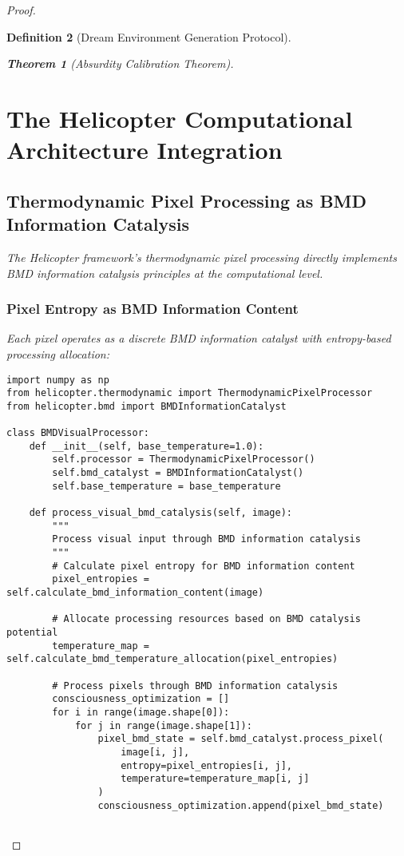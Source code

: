 \documentclass[12pt,a4paper]{article}
\newtheorem{theorem}{Theorem}[section]
\newtheorem{definition}[theorem]{Definition}
\begin{document}
\begin{proof}
\begin{definition}[Dream Environment Generation Protocol]
\begin{theorem}[Absurdity Calibration Theorem]
\section{The Helicopter Computational Architecture Integration}

\subsection{Thermodynamic Pixel Processing as BMD Information Catalysis}

The Helicopter framework's thermodynamic pixel processing directly implements BMD information catalysis principles at the computational level.

\subsubsection{Pixel Entropy as BMD Information Content}

Each pixel operates as a discrete BMD information catalyst with entropy-based processing allocation:

\begin{lstlisting}[style=pythonstyle, caption=BMD Thermodynamic Pixel Processing]
import numpy as np
from helicopter.thermodynamic import ThermodynamicPixelProcessor
from helicopter.bmd import BMDInformationCatalyst

class BMDVisualProcessor:
    def __init__(self, base_temperature=1.0):
        self.processor = ThermodynamicPixelProcessor()
        self.bmd_catalyst = BMDInformationCatalyst()
        self.base_temperature = base_temperature
        
    def process_visual_bmd_catalysis(self, image):
        """
        Process visual input through BMD information catalysis
        """
        # Calculate pixel entropy for BMD information content
        pixel_entropies = self.calculate_bmd_information_content(image)
        
        # Allocate processing resources based on BMD catalysis potential
        temperature_map = self.calculate_bmd_temperature_allocation(pixel_entropies)
        
        # Process pixels through BMD information catalysis
        consciousness_optimization = []
        for i in range(image.shape[0]):
            for j in range(image.shape[1]):
                pixel_bmd_state = self.bmd_catalyst.process_pixel(
                    image[i, j],
                    entropy=pixel_entropies[i, j],
                    temperature=temperature_map[i, j]
                )
                consciousness_optimization.append(pixel_bmd_state)
        

\end{lstlisting}
\end{theorem}
\end{definition}
\end{proof}
\end{document}
